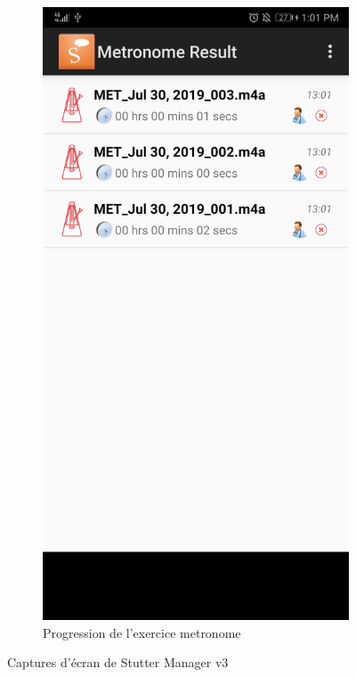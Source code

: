 \begin{appendices}
\begin{landscape}
\begin{figure}[h]
\begin{subfigure}{.25\textwidth}
    \includegraphics[width=.75\linewidth]{content/imgs/old_app_4.jpg}
    \caption{Progression de l'exercice metronome}
  \end{subfigure}
  \caption*{Captures d'écran de Stutter Manager v3}
\end{figure}

\end{landscape}



\end{appendices}
